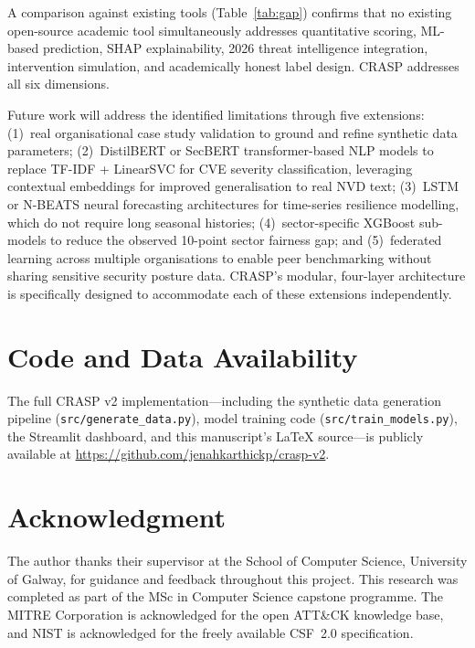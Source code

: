 \documentclass[journal]{IEEEtran}
\begin{document}
A comparison against existing tools (Table~\ref{tab:gap}) confirms that
no existing open-source academic tool simultaneously addresses quantitative
scoring, ML-based prediction, SHAP explainability, 2026 threat intelligence
integration, intervention simulation, and academically honest label design.
CRASP addresses all six dimensions.

Future work will address the identified limitations through five extensions:
(1)~real organisational case study validation to ground and refine synthetic
data parameters; (2)~DistilBERT or SecBERT transformer-based NLP models to
replace TF-IDF + LinearSVC for CVE severity classification, leveraging
contextual embeddings for improved generalisation to real NVD text;
(3)~LSTM or N-BEATS neural forecasting architectures for time-series
resilience modelling, which do not require long seasonal histories;
(4)~sector-specific XGBoost sub-models to reduce the observed 10-point
sector fairness gap; and (5)~federated learning across multiple
organisations to enable peer benchmarking without sharing sensitive security
posture data. CRASP's modular, four-layer architecture is specifically
designed to accommodate each of these extensions independently.


\section*{Code and Data Availability}

The full CRASP v2 implementation---including the synthetic data generation
pipeline (\texttt{src/generate\_data.py}), model training code
(\texttt{src/train\_models.py}), the Streamlit dashboard, and this
manuscript's \LaTeX{} source---is publicly available at
\url{https://github.com/jenahkarthickp/crasp-v2}.

\section*{Acknowledgment}

The author thanks their supervisor at the School of Computer Science,
University of Galway, for guidance and feedback throughout this project.
This research was completed as part of the MSc in Computer Science capstone
programme. The MITRE Corporation is acknowledged for the open ATT\&CK
knowledge base, and NIST is acknowledged for the freely available CSF~2.0
specification.
\end{document}
